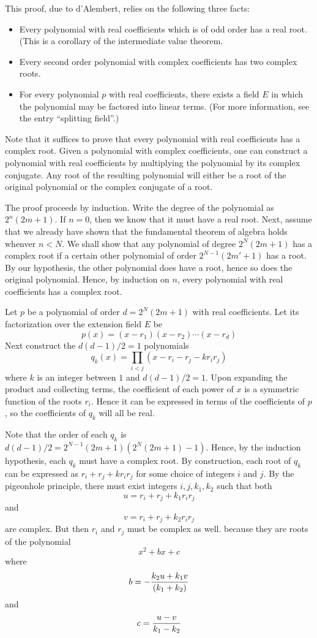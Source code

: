 \documentclass[12pt]{article}
\begin{document}
This proof, due to d'Alembert, relies on the following three facts:

\begin{itemize}
\item  Every polynomial with real coefficients which is of odd order has a real root.  (This is a corollary of the intermediate value theorem.
\item  Every second order polynomial with complex coefficients has two complex roots.
\item  For every polynomial $p$ with real coefficients, there exists a field $E$ in which the polynomial may be factored into linear terms.  (For more information, see the entry ``splitting field''.)
\end{itemize}

Note that it suffices to prove that every polynomial with real coefficients has a complex root.  Given a polynomial with complex coefficients, one can construct a polynomial with real coefficients by multiplying the polynomial by its complex conjugate.  Any root of the resulting polynomial will either be a root of the original polynomial or the complex conjugate of a root.

The proof proceeds by induction.  Write the degree of the polynomial as $2^n (2m+1)$.  If $n = 0$, then we know that it must have a real root.  Next, assume that we already have shown that the fundamental theorem of algebra holds whenver $n < N$.  We shall show that any polynomial of degree $2^N (2m+1)$ has a complex root if a certain other polynomial of order $2^{N-1} (2m' + 1)$ has a root.  By our hypothesis, the other polynomial does have a root, hence so does the original polynomial.  Hence, by induction on $n$, every polynomial with real coefficients has a complex root.

Let $p$ be a polynomial of order $d = 2^N (2m+1)$ with real coefficients.  Let its factorization over the extension field $E$ be
 $$p(x) = (x - r_1) (x - r_2) \cdots (x - r_d)$$
Next construct the $d(d-1)/2 = 1$ polynomials
 $$q_k (x) = \prod_{i < j} (x - r_i - r_j - k r_i r_j)$$
where $k$ is an integer between $1$ and $d(d-1)/2 = 1$.  Upon expanding the product and collecting terms, the coefficient of each power of $x$ is a symmetric function of the roots $r_i$.  Hence it can be expressed in terms of the coefficients of $p$, so the coefficients of $q_k$ will all be real.

Note that the order of each $q_k$ is $d(d-1)/2 = 2^{N-1} (2m+1) (2^N (2m+1) - 1)$.  Hence, by the induction hypothesis, each $q_k$ must have a complex root.  By construction, each root of $q_k$ can be expressed as $r_i + r_j + k r_i r_j$ for some choice of integers $i$ and $j$.  By the pigeonhole principle, there must exist integers $i, j, k_1, k_2$ such that both
 $$u = r_i + r_j + k_1 r_i r_j$$
and
 $$v = r_i + r_j + k_2 r_i r_j$$
are complex.  But then $r_i$ and $r_j$ must be complex as well. because they are roots of the polynomial
 $$x^2 + bx + c$$
where
 $$b = -{k_2 u + k_1 v \over (k_1 + k_2)}$$
and
 $$c = {u - v \over k_1 - k_2}$$
\end{document}

